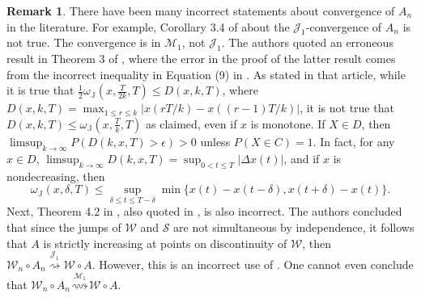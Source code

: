 \documentclass[final]{amsart}
\theoremstyle{definition}
\newtheorem{rem}{Remark}[section]
\numberwithin{equation}{section}
\def\disp{\displaystyle}
\newcommand{\dJ}{\ensuremath{\mathbb{J}}}
\newcommand{\cJ}{\ensuremath{\mathcal{J}}}
\newcommand{\cM}{\ensuremath{\mathcal{M}}}
\newcommand{\cS}{\ensuremath{\mathcal{S}}}
\newcommand{\cW}{\ensuremath{\mathcal{W}}}
\begin{document}
\begin{rem}\label{rem:error} There have been many incorrect statements about convergence of $A_n$ in the literature. For example, Corollary 3.4 of \cite{Meerschaert/Scheffler:2004} about the $\cJ_1$-convergence of $A_n$  is not true. The convergence is in $\cM_1$, not $\cJ_1$. The authors quoted an erroneous result in Theorem 3 of \cite{Bingham:1971}, where the error in the proof of the latter result comes from the incorrect inequality in Equation (9) in \cite{Bingham:1971}. As stated in that article,
while it is true that
$\frac{1}{2}\omega_\dJ\left(x,\frac{T}{2k},T\right) \le D(x,k,T)$, where $\disp D(x,k,T) = \max_{1\le r\le k}|x(rT/k)-x((r-1)T/k)|$, it is not true that $D(x,k,T) \le \omega_\dJ\left(x,\frac{T}{k},T\right)$ as claimed, even if $x$ is monotone. If $X\in D$, then $\limsup_{k\to\infty}P(D(k,x,T)>\epsilon) >0$ unless $P(X\in C)=1$. In fact, for any $x\in D$,
$\disp \limsup_{k\to\infty}D(k,x,T) =\sup_{0<t\le T}|\Delta x(t)|$, and if $x$ is nondecreasing, then
$$
\omega_\dJ\left(x,\delta,T\right) \le \sup_{\delta\le t \le T-\delta}\min\{x(t)-x(t-\delta),x(t+\delta)-x(t)\}.
$$
Next, Theorem 4.2 in \cite{Meerschaert/Scheffler:2004}, also quoted in  \cite{Scalas/Viles:2012,Scalas/Viles:2014}, is also incorrect. The authors concluded
 that since the jumps of $\cW$ and $\cS$ are not simultaneous by independence, it follows that $A$ is strictly increasing at points on discontinuity of $\cW$, then $\cW_n\circ A_n \stackrel{\cJ_1}{\rightsquigarrow}\cW\circ A$.
 However, this is an incorrect use of  \citep[Theorem 13.2.4]{Whitt:2002}.
 One cannot even conclude that $\cW_n\circ A_n \stackrel{\cM_1}{\rightsquigarrow}\cW\circ A$.
\end{rem}
\end{document}
